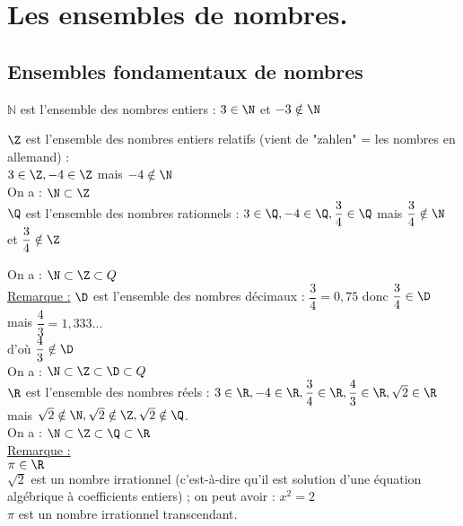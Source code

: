 
\section{Les ensembles de nombres.}

\subsection{Ensembles fondamentaux de nombres}

$\mathbb{N}$ est l'ensemble des nombres entiers  : $ 3 \in \N $ et $-3 \notin \N$

$ \Z $ est l'ensemble des nombres entiers relatifs (vient de "zahlen" = les nombres en allemand) : \\ $ 3 \in \Z, -4 \in \Z $ mais $ -4 \notin \N $ \\

On a : $ \N \subset \Z $ \\


$ \Q $ est l'ensemble des nombres rationnels : $ 3 \in \Q, -4 \in \Q, \dfrac{3}{4} \in \Q $ mais $ \dfrac{3}{4} \notin \N $ et $ \dfrac{3}{4} \notin \Z $

On a : $ \N \subset \Z \subset Q $ \\

\underline{Remarque :} $ \D $ est l'ensemble des nombres décimaux : $ \dfrac{3}{4} = 0,75 $ donc $ \dfrac{3}{4} \in \D $ mais  $ \dfrac{4}{3} = 1,333... $ \\ d'où $ \dfrac{4}{3} \notin \D $ \\ 

On a : $ \N \subset \Z \subset \D \subset Q $ \\

$ \R $ est l'ensemble des nombres réels : $ 3 \in \R, -4 \in \R, \dfrac{3}{4} \in \R, \dfrac{4}{3} \in \R, \sqrt{2} \in \R $ \\ mais $ \sqrt{2} \notin \N, \sqrt{2} \notin \Z, \sqrt{2} \notin \Q $. \\

On a : $ \N \subset \Z \subset \Q \subset \R $ \\

\underline{Remarque :} \\ $ \pi \in \R $ \\
$ \sqrt{2} $ est un nombre irrationnel  (c'est-à-dire qu'il est solution d'une équation algébrique à coefficients entiers) ; on peut avoir : $ x^{2} = 2 $ \\

$\pi $ est un nombre irrationnel transcendant. 

